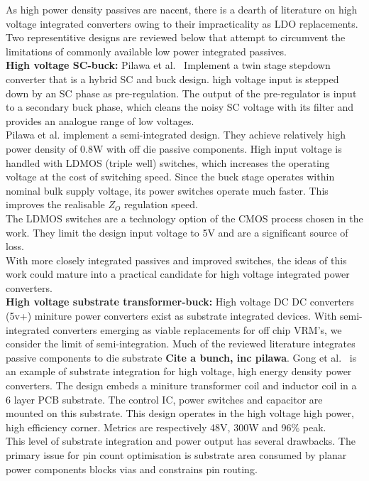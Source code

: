 \documentclass[letterpaper,twocolumn,10pt]{article}
\begin{document}
\indent As high power density passives are nacent, there is a dearth of literature on high voltage integrated converters owing to their impracticality as LDO replacements. Two representitive designs are reviewed below that attempt to circumvent the limitations of commonly available low power integrated passives.\\
\textbf{High voltage SC-buck: }Pilawa et al.~\cite{pilawa2012} Implement a twin stage stepdown converter that is a hybrid SC and buck design. high voltage input is stepped down by an SC phase as pre-regulation. The output of the pre-regulator is input to a secondary buck phase, which cleans the noisy SC voltage with its filter and provides an analogue range of low voltages.\\
Pilawa et al. implement a semi-integrated design. They achieve relatively high power density of 0.8W with off die passive components. High input voltage is handled with LDMOS (triple well) switches, which increases the operating voltage at the cost of switching speed. Since the buck stage operates within nominal bulk supply voltage, its power switches operate much faster. This improves the realisable $Z_O$ regulation speed.\\
The LDMOS switches are a technology option of the CMOS process chosen in the work. They limit the design input voltage to 5V and are a significant source of loss.\\
With more closely integrated passives and improved switches, the ideas of this work could mature into a practical candidate for high voltage integrated power converters.\\
\textbf{High voltage substrate transformer-buck: }High voltage DC DC converters (5v+) miniture power converters exist as substrate integrated devices. With semi-integrated converters emerging as viable replacements for off chip VRM's, we consider the limit of semi-integration. Much of the reviewed literature integrates passive components to die substrate \textbf{Cite a bunch, inc pilawa}. Gong et al.~\cite{Gong2008} is an example of substrate integration for high voltage, high energy density power converters. The design embeds a miniture transformer coil and inductor coil in a 6 layer PCB substrate. The control IC, power switches and capacitor are mounted on this substrate. This design operates in the high voltage high power, high efficiency corner. Metrics are respectively 48V, 300W and 96\% peak.\\
This level of substrate integration and power output has several drawbacks. The primary issue for pin count optimisation is substrate area consumed by planar power components blocks vias and constrains pin routing.\\
\end{document}
